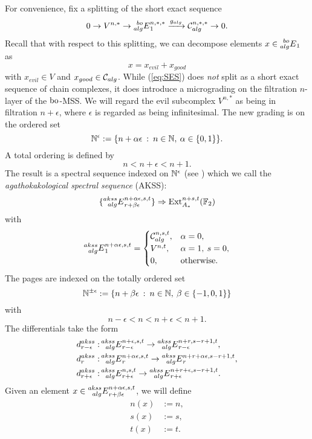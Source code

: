 For convenience, fix a splitting of the short exact sequence
\begin{equation}\label{eq:SES} 
0 \rightarrow V^{n,*} \rightarrow \prescript{bo}{alg}{E}^{n,*,*}_1 \xrightarrow{g_{alg}} \mathcal{C}^{n,*,*}_{alg} \rightarrow 0.
\end{equation}
Recall that with respect to this splitting, we can decompose elements $x \in \prescript{bo}{alg}{E}_1$ as
$$ x = x_{evil} + x_{good} $$
with $x_{evil} \in V$ and $x_{good} \in \mathcal{C}_{alg}$.  While (\ref{eq:SES}) does \emph{not} split as a short exact sequence of chain complexes, it does
introduce a micrograding on the filtration $n$-layer of the $\mathrm{bo}$-MSS.
We will regard the evil subcomplex $V^{n,*}$ as being in filtration $n + \epsilon$, where $\epsilon$ is regarded as being infinitesimal.  The new grading is on the ordered set
$$ \mathbb{N}^\epsilon := \{ n + \alpha \epsilon \: : \: n \in \mathbb{N}, \: \alpha \in \{0,1\} \}. $$
A total ordering is defined by
$$ n < n + \epsilon < n+1. $$
The result is a spectral sequence indexed on $\mathbb{N}^\epsilon$ (see \cite{Matschke}) which we call the \emph{agathokakological spectral sequence} (AKSS):
$$ \{ \prescript{akss}{alg}{E}^{n+\alpha\epsilon,s,t}_{r + \beta \epsilon} \} \Rightarrow \operatorname{Ext}^{n+s, t}_{A_*}(\mathbb{F}_2) $$
with
$$\prescript{akss}{alg}{E}^{n+\alpha \epsilon, s, t}_1 = 
\begin{cases}
\mathcal{C}^{n, s, t}_{alg}, & \alpha = 0, \\
V^{n, t}, & \alpha = 1, \: s = 0, \\
0, & \text{otherwise}.
\end{cases}
$$
The pages are indexed on the totally ordered set
$$ \mathbb{N}^{\pm \epsilon} := \{ n + \beta \epsilon \: : \: n \in \mathbb{N}, \: \beta \in \{-1,0,1\} \} $$
with
$$ n - \epsilon < n < n + \epsilon < n+1. $$
The differentials take the form
\begin{align*}
d^{akss}_{r-\epsilon}:  & \prescript{akss}{alg}{E}_{r - \epsilon}^{n+ \epsilon, s, t} \rightarrow \prescript{akss}{alg}{E}_{r- \epsilon}^{n+r, s-r+1, t}, \\
d^{akss}_{r}:  & \prescript{akss}{alg}{E}_{r}^{n+ \alpha\epsilon, s, t} \rightarrow \prescript{akss}{alg}{E}_{r}^{n+r +\alpha\epsilon, s-r+1, t}, \\
d^{akss}_{r+\epsilon}:  & \prescript{akss}{alg}{E}_{r+\epsilon}^{n, s, t} \rightarrow \prescript{akss}{alg}{E}_{r+ \epsilon}^{n+r +\epsilon, s-r+1, t}.
\end{align*}
Given an element $x \in \prescript{akss}{alg}{E}_{r+\beta\epsilon}^{n+\alpha\epsilon, s, t}$, we will define
\begin{align*}
n(x) & := n, \\
s(x) & := s, \\
t(x) & := t.
\end{align*}
